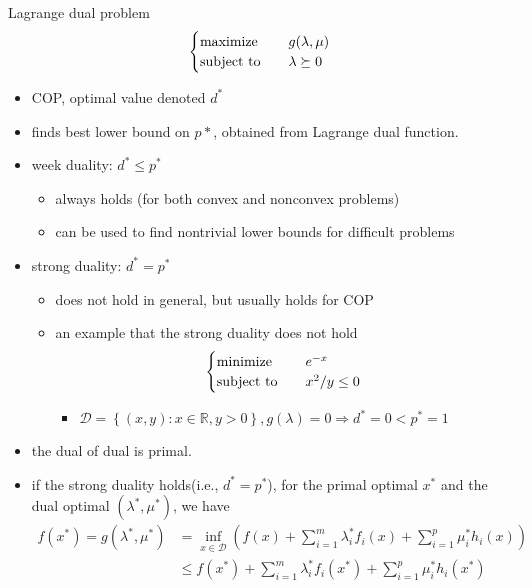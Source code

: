 \begin{remark}
    Lagrange dual problem\[\begin{cases}
        \operatorname{maximize} \quad &g(\lambda, \mu)\\
        \operatorname{subject\ to} \quad &\lambda \succeq 0
    \end{cases}\]
    \begin{itemize}
        \item COP, optimal value denoted $d^*$
        \item finds best lower bound on $p*$, obtained from Lagrange dual function.
        \item week duality: $d^* \le p^*$\begin{itemize}
            \item always holds (for both convex and nonconvex problems)
            \item can be used to find nontrivial lower bounds for difficult problems
        \end{itemize}
        \item strong duality: $d^* = p^*$\begin{itemize}
            \item does not hold in general, but usually holds for COP
            \item an example that the strong duality does not hold\[\begin{cases}
                \operatorname{minimize} \quad &e^{-x}\\
                \operatorname{subject\ to} \quad &x^2 / y \le 0
            \end{cases}\]\begin{itemize}
                \item $\mathcal{D} = \left\{(x, y): x \in \mathbb{R}, y > 0\right\}, g(\lambda) = 0 \Longrightarrow d^* = 0 < p^* = 1$
            \end{itemize}
        \end{itemize}
        \item the dual of dual is primal.
        \item if the strong duality holds(i.e., $d^* = p^*$), for the primal optimal $x^*$ and the dual optimal $(\lambda^*, \mu^*)$, we have \begin{align*}
            f(x^*) = g(\lambda^*, \mu^*) &=\inf _{x \in \mathcal{D}}\left(f(x)+\sum_{i=1}^{m} \lambda_{i}^{*} f_{i}(x)+\sum_{i=1}^{p} \mu_{i}^{*} h_{i}(x)\right) \\
            &\leq f\left(x^{*}\right)+\sum_{i=1}^{m} \lambda_{i}^{*} f_{i}\left(x^{*}\right)+\sum_{i=1}^{p} \mu_{i}^{*} h_{i}\left(x^{*}\right) \\

\end{align*}
\end{itemize}
\end{remark}
